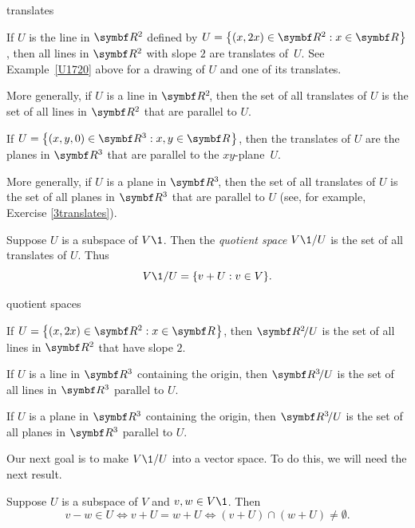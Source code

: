 \begin{example}{translates}
\begin{Itemize}
\item
If $U$ is the line in $\R2$ defined by $U = \br[\big]{(x, 2x) \in \R2: x \in \R{}}$, then all lines in $\R2$ with slope $2$ are translates of~$U$. See Example~\ref{U1720} above for a drawing of $U$ and one of its translates.
\item
More generally, if $U$ is a line in $\RR 2$, then the set of all translates of $U$ is the set of all lines in $\R2$ that are parallel to $U$.
\item
If $U = \br[\big]{(x, y, 0) \in \R{3}: x, y \in \R{}}$, then the translates of $U$ are the planes in $\R3$ that are parallel to the $xy$-plane~$U$.
\item
More generally, if $U$ is a plane in $\R3\!$, then the set of all translates of $U$ is the set of all planes in $\R3$ that are parallel to $U$ (see, for example, Exercise \ref{3translates}).
\end{Itemize}
\exampleitemend
\end{example}

{
Suppose $U$ is a subspace of $V\1$. Then the \emph{quotient space} $V\1/U$ is the set of all translates of $U$. Thus
\[
V\1/U = \{ v + U : v \in V \}.
\]}

\begin{example}{quotient spaces}
\begin{Itemize}
\item
If $U = \br[\big]{(x, 2x) \in \R2: x \in \R{}}$, then $\RR2/U$ is the set of all lines in $\R2$ that have slope $2$.
\item
If $U$ is a line in $\R3$ containing the origin, then $\RR3/U$ is the set of all lines in $\R3$ parallel to $U$.
\item
If $U$ is a plane in $\R3$ containing the origin, then $\RR3/U$ is the set of all planes in $\R3$ parallel to $U$.
\end{Itemize}
\exampleitemend
\end{example}

Our next goal is to make $V\1/U$ into a vector space. To do this, we will need the next result.

{Suppose $U$ is a subspace of $V$ and $v, w \in V\1$. Then
\[
v - w \in U
\iff
v+U =w+U
\iff
(v+U) \cap (w+U) \ne \emptyset.
\]
}

